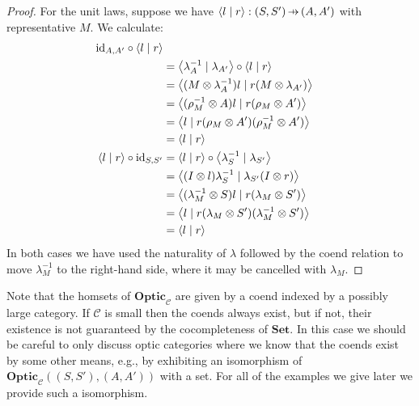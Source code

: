 \documentclass[11pt,letterpaper]{article}
\theoremstyle{plain}
\theoremstyle{definition}
\newcommand{\C}{\mathscr{C}}
\newcommand{\Set}{\mathbf{Set}}
\newcommand{\Optic}{\mathbf{Optic}}
\newcommand{\id}{\mathrm{id}}
\newcommand{\rep}[2]{{\ensuremath \left\langle #1 \mid #2 \right\rangle}}
\newcommand{\hto}{\ensuremath{\,\mathaccent\shortmid\rightarrow\,}}
\begin{document}
\begin{proof}
  For the unit laws, suppose we have $\rep{l}{r} : (S, S') \hto (A, A')$ with representative $M$. We calculate:
  \begin{align*}
    \id_{A, A'} \circ \rep{l}{r} \\
    &= \rep{\lambda^{-1}_A}{\lambda_{A'}} \circ \rep{l}{r} \\
    &= \rep{(M \otimes \lambda^{-1}_A) l}{r (M \otimes  \lambda_{A'})} \\
    &= \rep{(\rho^{-1}_M \otimes  A) l}{r (\rho_M \otimes A')} \\
    &= \rep{l}{r (\rho_M \otimes A') (\rho^{-1}_M \otimes A')} \\
    &= \rep{l}{r} \\
    \rep{l}{r} \circ \id_{S, S'}
    &= \rep{l}{r} \circ \rep{\lambda^{-1}_S}{\lambda_{S'}}  \\
    &= \rep{(I \otimes l)\lambda^{-1}_S}{\lambda_{S'} (I \otimes r)} \\
    &= \rep{(\lambda^{-1}_M \otimes S)l}{r (\lambda_{M} \otimes S')} \\
    &= \rep{l}{r (\lambda_{M} \otimes S')(\lambda^{-1}_M \otimes S')} \\
    &= \rep{l}{r}
  \end{align*}
  In both cases we have used the naturality of $\lambda$ followed by the coend relation to move $\lambda^{-1}_M$ to the right-hand side, where it may be cancelled with $\lambda_M$.
\end{proof}

  Note that the homsets of $\Optic_\C$ are given by a coend indexed by a possibly large category. If $\C$ is small then the coends always exist, but if not, their existence is not guaranteed by the cocompleteness of $\Set$. In this case we should be careful to only discuss optic categories where we know that the coends exist by some other means, e.g., by exhibiting an isomorphism of $\Optic_\C((S, S'), (A, A'))$ with a set. For all of the examples we give later we provide such a isomorphism.
\end{document}
